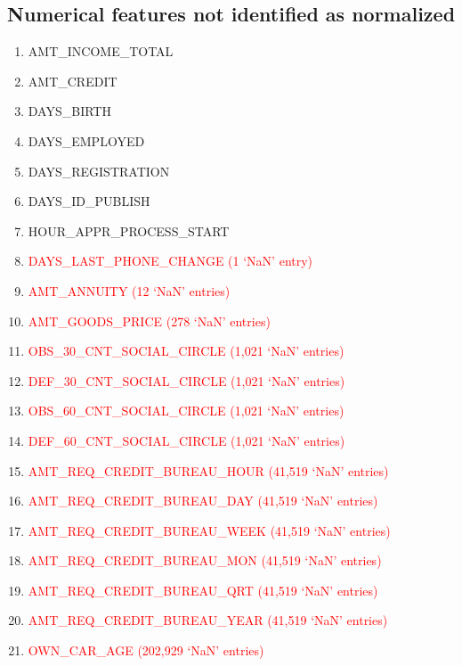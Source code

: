 \documentclass[12pt, letterpaper]{article}
\begin{document}
\begin{appendices}
\subsection{Numerical features not identified as normalized}
\label{numericalfeatnotnormalized}
\footnotesize
\begin{enumerate}
 \item AMT_INCOME_TOTAL
 \item AMT_CREDIT
 \item DAYS_BIRTH
 \item DAYS_EMPLOYED
 \item DAYS_REGISTRATION
 \item DAYS_ID_PUBLISH
 \item HOUR_APPR_PROCESS_START
 \item \textcolor{red}{DAYS_LAST_PHONE_CHANGE (1 `NaN' entry)}
 \item \textcolor{red}{AMT_ANNUITY (12 `NaN' entries)}
 \item \textcolor{red}{AMT_GOODS_PRICE (278 `NaN' entries)}
 \item \textcolor{red}{OBS_30_CNT_SOCIAL_CIRCLE (1,021 `NaN' entries)}
 \item \textcolor{red}{DEF_30_CNT_SOCIAL_CIRCLE (1,021 `NaN' entries)}
 \item \textcolor{red}{OBS_60_CNT_SOCIAL_CIRCLE (1,021 `NaN' entries)}
 \item \textcolor{red}{DEF_60_CNT_SOCIAL_CIRCLE (1,021 `NaN' entries)}
 \item \textcolor{red}{AMT_REQ_CREDIT_BUREAU_HOUR (41,519 `NaN' entries)}
 \item \textcolor{red}{AMT_REQ_CREDIT_BUREAU_DAY (41,519 `NaN' entries)}
 \item \textcolor{red}{AMT_REQ_CREDIT_BUREAU_WEEK (41,519 `NaN' entries)}
 \item \textcolor{red}{AMT_REQ_CREDIT_BUREAU_MON (41,519 `NaN' entries)}
 \item \textcolor{red}{AMT_REQ_CREDIT_BUREAU_QRT (41,519 `NaN' entries)}
 \item \textcolor{red}{AMT_REQ_CREDIT_BUREAU_YEAR (41,519 `NaN' entries)}
 \item \textcolor{red}{OWN_CAR_AGE (202,929 `NaN' entries)}
\end{enumerate}
\normalsize


\end{appendices}
\end{document}
